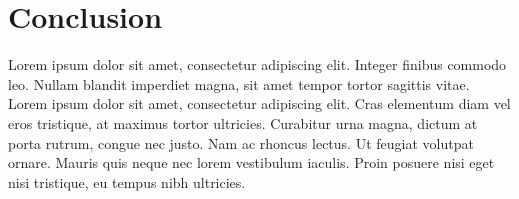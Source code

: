 \documentclass[
  digital,     %
  oneside,     %
  nosansbold,  %
  nocolorbold, %
  lof,         %
  lot,         %
]{fithesis4}
\begin{document}
\chapter*{Conclusion}
\shorthandoff{-}
Lorem ipsum dolor sit amet, consectetur adipiscing elit. Integer finibus commodo leo. Nullam blandit imperdiet magna, sit amet tempor tortor sagittis vitae. Lorem ipsum dolor sit amet, consectetur adipiscing elit. Cras elementum diam vel eros tristique, at maximus tortor ultricies. Curabitur urna magna, dictum at porta rutrum, congue nec justo. Nam ac rhoncus lectus. Ut feugiat volutpat ornare. Mauris quis neque nec lorem vestibulum iaculis. Proin posuere nisi eget nisi tristique, eu tempus nibh ultricies.
\shorthandon{-}

\printbibliography[heading=bibintoc]
\end{document}
